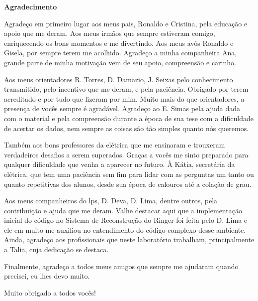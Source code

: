 \cleardoublepage

\begin{center}
\textbf{\Large Agradecimento}
\end{center}

Agradeço em primeiro lugar aos meus pais, Ronaldo e Cristina, 
pela educação e apoio que me deram. Aos meus irmãos que sempre
estiveram comigo, enriquecendo os bons momentos e me divertindo. Aos meus 
avôs Ronaldo e Gisela, por sempre terem me acolhido. Agradeço a minha
companheira Ana, grande parte de minha motivação vem 
de seu apoio, compreensão e carinho.

Aos meus orientadores R. Torres, D. Damazio, J. Seixas pelo conhecimento
transmitido, pelo incentivo que me deram, e pela paciência. Obrigado 
por terem acreditado e por tudo que fizeram por mim. Muito mais do que
orientadores, a presença de vocês sempre é agradável. Agradeço ao E. Simas pela
ajuda dada com o material e pela compreensão durante a época de sua tese com a
dificuldade de acertar os dados, nem sempre as coisas são tão simples quanto nós
queremos.

Também aos bons professores da elétrica que me ensinaram e trouxeram 
verdadeiros desafios a serem superados. Graças a vocês me sinto preparado para
qualquer dificuldade que venha a aparecer no futuro.
À Kátia, secretária da elétrica, que tem uma paciência sem fim para lidar com as
perguntas um tanto ou quanto repetitivas dos alunos, desde sua época de calouros
até a colação de grau. 


Aos meus companheiros do \acrshort{lps}, D. Deva, D. Lima, 
dentre outros, pela contribuição e ajuda que me deram. Valhe destacar aqui que a
implementação inicial do código no Sistema de Reconstrução do Ringer foi feita pelo D. Lima
e ele em muito me auxiliou no entendimento do código complexo desse ambiente. 
Ainda, agradeço aos profissionais que neste 
laboratório trabalham, principalmente a Talia, cuja dedicação se destaca.

Finalmente, agradeço a todos meus amigos que sempre me ajudaram quando precisei, 
eu lhes devo muito.

Muito obrigado a todos vocês!

